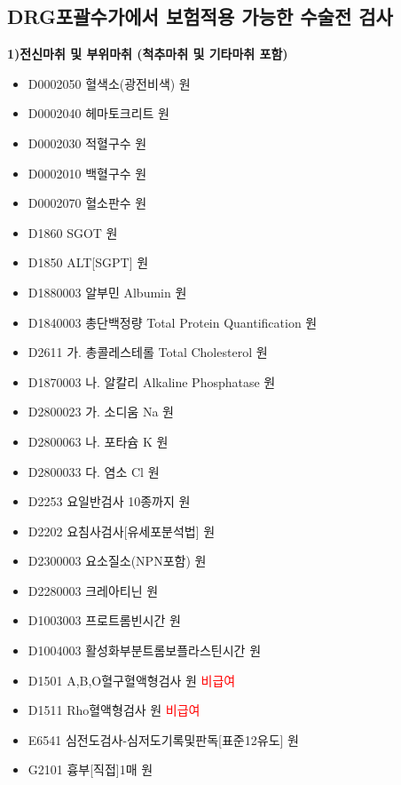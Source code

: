 \subsection{DRG포괄수가에서 보험적용 가능한 수술전 검사}
\myde{}
{
\textbf{1)전신마취 및 부위마취 (척추마취 및 기타마취 포함)}\par
\begin{itemize}\tightlist
\item[\dschemical] D0002050 혈색소(광전비색)  원
\item[\dschemical] D0002040 헤마토크리트  원
\item[\dschemical] D0002030 적혈구수  원
\item[\dschemical] D0002010 백혈구수  원
\item[\dschemical] D0002070 혈소판수  원
\item[\dschemical] D1860 SGOT  원
\item[\dschemical] D1850 ALT[SGPT]  원
\item[\dschemical] D1880003 알부민 Albumin  원
\item[\dschemical] D1840003 총단백정량 Total Protein Quantification  원
\item[\dschemical] D2611 가. 총콜레스테롤 Total Cholesterol  원
\item[\dschemical] D1870003 나. 알칼리 Alkaline Phosphatase   원
\item[\dschemical] D2800023 가. 소디움 Na  원
\item[\dschemical] D2800063 나. 포타슘 K  원
\item[\dschemical] D2800033 다. 염소 Cl  원 
\item[\dschemical] D2253 요일반검사 10종까지  원
\item[\dschemical] D2202 요침사검사[유세포분석법]  원
\item[\dschemical] D2300003 요소질소(NPN포함)  원
\item[\dschemical] D2280003 크레아티닌  원
\item[\dschemical] D1003003 프로트롬빈시간  원
\item[\dschemical] D1004003 활성화부분트롬보플라스틴시간  원
\item[\dschemical] D1501 A,B,O혈구혈액형검사  원 \textcolor{red}{비급여}
\item[\dschemical] D1511 Rho혈액형검사  원 \textcolor{red}{비급여}
\item[\dschemical] E6541 심전도검사-심저도기록및판독[표준12유도]  원
\item[\dschemical] G2101 흉부[직접]1매  원
\end{itemize}

}
